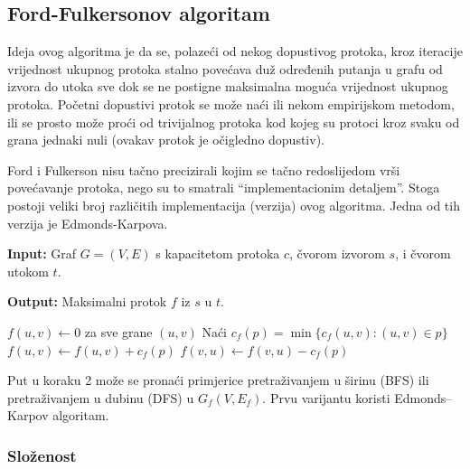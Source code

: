 \documentclass[11pt, a4paper]{article}
\begin{document}
	\subsection{Ford-Fulkersonov algoritam}
	
	Ideja ovog algoritma je da se, polazeći od nekog dopustivog protoka, kroz
	iteracije vrijednost ukupnog protoka stalno povećava duž određenih putanja u grafu od izvora do utoka sve
	dok se ne postigne maksimalna moguća vrijednost ukupnog protoka. Početni dopustivi protok se može naći
	ili nekom empirijskom metodom, ili se prosto može proći od trivijalnog protoka kod kojeg su protoci kroz
	svaku od grana jednaki nuli (ovakav protok je očigledno dopustiv).
	
	Ford i Fulkerson nisu tačno precizirali kojim se tačno redoslijedom vrši povećavanje protoka, nego su to
	smatrali “implementacionim detaljem”. Stoga postoji veliki broj različitih implementacija (verzija) ovog
	algoritma. Jedna od tih verzija je Edmonds-Karpova.
	
	\begin{algorithm}
		\renewcommand{\thealgorithm}{}
		\caption{}
		\textbf{Input:} Graf $G = (V, E)$ s kapacitetom protoka $c$, čvorom izvorom $s$, i čvorom utokom $t$.\\
		\begin{minipage}{\linewidth}
			\textbf{Output:} Maksimalni protok $f$ iz $s$ u $t$.
		\end{minipage}
		\begin{algorithmic}[1]
			\STATE $f(u,v) \gets 0$ za sve grane $(u,v)$
			\STATE Naći $c_f(p) = \min\{c_f(u,v):(u,v) \in p\}$
			\STATE $f(u,v) \gets f(u,v) + c_f(p)$ 
			\STATE $f(v,u) \gets f(v,u) - c_f(p)$ 
			\ENDFOR
			\ENDWHILE
		\end{algorithmic}
	\end{algorithm}
	
	Put u koraku 2 može se pronaći primjerice pretraživanjem u širinu (BFS) ili pretraživanjem u dubinu (DFS) u $G_{f}(V,E_{f})$. Prvu varijantu koristi Edmonds–Karpov algoritam.
	
	\subsubsection*{Složenost}
	
\end{document}
